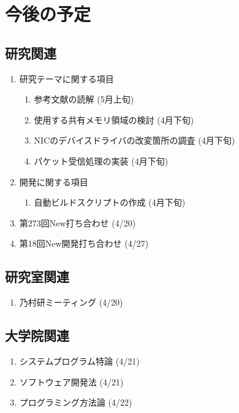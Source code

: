 \documentclass[fleqn, 14pt]{extarticle}
\begin{document}
\section{今後の予定}
\label{sec-4}
\subsection{研究関連}
\label{sec-4-1}

\begin{enumerate}
\item 研究テーマに関する項目
\hfill
\begin{enumerate}


\item 参考文献の読解
\hfill
(5月上旬)

\item 使用する共有メモリ領域の検討
\hfill
(4月下旬)

\item NICのデバイスドライバの改変箇所の調査
\hfill
(4月下旬)

\item パケット受信処理の実装
\hfill
(4月下旬)
\end{enumerate}
\item 開発に関する項目
\hfill
\begin{enumerate}

\item 自動ビルドスクリプトの作成
\hfill
(4月下旬)

\end{enumerate}
\item 第273回New打ち合わせ
\hfill
\label{enum-7}
(4/20)
\item 第18回New開発打ち合わせ
\hfill
\label{enum-7}
(4/27)
\end{enumerate}
\subsection{研究室関連}
\label{sec-4-2}

\begin{enumerate}

\item 乃村研ミーティング 
\hfill
\label{enum-18}
(4/20)
\end{enumerate}

\subsection{大学院関連}
\begin{enumerate}

\item システムプログラム特論
\hfill
\label{enum-17}
(4/21)
\item ソフトウェア開発法
\hfill
\label{enum-17}
(4/21)
\item プログラミング方法論
\hfill
\label{enum-17}
(4/22)

\end{enumerate}
\end{document}
